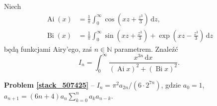 %

\begin{problem}[pytanie 507425]
    \label{stack_507425}%
    Niech
    \begin{align}
        \operatorname{Ai} (x) & = \frac 1 \pi \int_0^\infty \cos \left( x z + \frac {z^3} 3 \right) \,\mathrm{d}z, \\
        \operatorname{Bi} (x) & = \frac 1 \pi \int_0^\infty \sin \left( x z + \frac {z^3} 3 \right) + \exp \left( x z - \frac {z^3} 3 \right) \,\mathrm{d}z
    \end{align}
    będą funkcjami Airy'ego, zaś $n \in \mathbb N$ parametrem.
    Znaleźć
    \begin{equation}
        I_n = \int_0^\infty \frac{x^{3n} \,\mathrm{d} x}{(\operatorname{Ai} x)^2 + (\operatorname{Bi} x)^2}.
    \end{equation}
\end{problem}

\textbf{Problem \ref{stack_507425}} -- $I_n = \pi^2 a_{2n} / (6 \cdot 2^{7n})$, gdzie $a_0 = 1$, $a_{n+1} = (6n+4)a_n \sum_{k=0}^n a_k a_{n-k}$. %

%